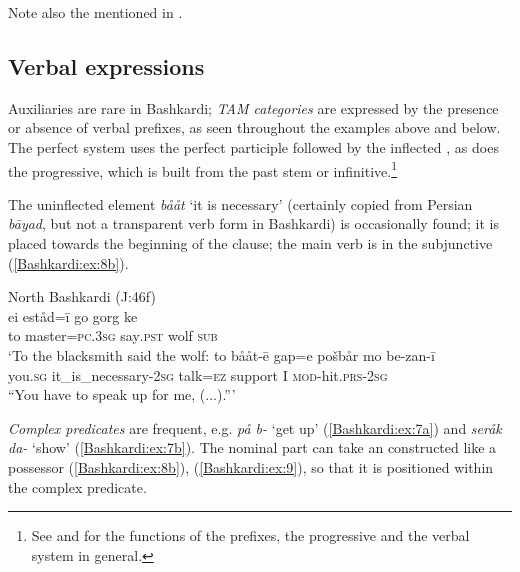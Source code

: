 \documentclass[output=paper,colorlinks,citecolor=brown]{langscibook}
\begin{document}

Note also the   mentioned in .

\subsection{Verbal expressions}\label{Bashkardi:ss:2.2}

Auxiliaries are rare in Bashkardi; \emph{TAM categories} are expressed by the presence or absence of verbal prefixes, as seen throughout the examples above and below. The perfect system uses the perfect participle followed by the inflected , as does the progressive, which is built from the past stem or infinitive.\footnote{
See \citet{korn2022areal} and \citet{korn2017contact} for the functions of the prefixes, the progressive and the verbal system in general. 
}

The uninflected element \textit{bååt} `it is necessary' (certainly copied from Persian \textit{bāyad}, but not a transparent verb form in Bashkardi) is occasionally found; it is placed towards the beginning of the clause; the main verb is in the subjunctive (\ref{Bashkardi:ex:8b}). 

\pagebreak
\ea\label{Bashkardi:ex:8} 
North Bashkardi (J:46f) \\
\ea\label{Bashkardi:ex:8a} 
\gll ei eståd=ī go gorg ke \\
to master\textsc{=pc.3sg} say\textsc{.pst} wolf \textsc{sub} \\
\glt `To the blacksmith said the wolf:
\ex\label{Bashkardi:ex:8b}
\gll to bååt-ē gap=e pošbår mo be-zan-ī \\
you\textsc{.sg} it\_is\_necessary\textsc{-2sg} talk\textsc{=ez} support I \textsc{mod-}hit\textsc{.prs}\textsc{-2sg} \\
\glt ``You have to speak up for me, (...).''{}'
\z
\z

\emph{Complex predicates} are frequent, e.g. \textit{på b-} `get up' (\ref{Bashkardi:ex:7a}) and \textit{seråk da-} `show' (\ref{Bashkardi:ex:7b}). The nominal part can take an  constructed like a possessor (\ref{Bashkardi:ex:8b}), (\ref{Bashkardi:ex:9}), so that it is positioned within the complex predicate.
\end{document}
